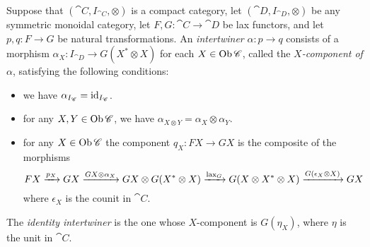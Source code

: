 \documentclass[12pt,oneside,article,draft]{memoir}
\begin{document}
\begin{definition}

Suppose that $(\cat{C},I_{\cat{C}},\otimes)$ is a compact category, let $(\cat{D},I_{\cat{D}},\otimes)$ be any symmetric monoidal category, let $F,G\colon\cat{C}\to\cat{D}$ be lax functors, and let $p,q\colon F\to G$ be natural transformations.
An \emph{intertwiner} $\alpha\colon p\to q$ consists of a morphism $\alpha_X\colon I_{\cat{D}}\to G(X^\ast\otimes X)$ for each $X\in\operatorname{Ob}\mathscr{C}$, called the \emph{$X$-component of $\alpha$}, satisfying the following conditions:
\begin{itemize}
   \item we have $\alpha_{I_{\mathscr{C}}}=\operatorname{id}_{I_{\mathscr{C}}}$.
   \item for any $X,Y\in\operatorname{Ob}\mathscr{C}$, we have $\alpha_{X\otimes Y}=\alpha_X\otimes\alpha_Y$.
   \item for any $X\in\operatorname{Ob}\mathscr{C}$ the component $q_X\colon FX\to GX$ is the composite of the morphisms
      $$FX\xrightarrow{p_X}GX\xrightarrow{GX\otimes\alpha_X}
      GX\otimes G(X^\ast\otimes X)\xrightarrow{\textnormal{lax}_G}
      G(X\otimes X^\ast\otimes X)\xrightarrow{G(\epsilon_X\otimes X)}
      GX
      $$
   where $\epsilon_X$ is the counit in $\cat{C}$.
\end{itemize}
The \emph{identity intertwiner} is the one whose $X$-component is $G(\eta_X)$, where $\eta$ is the unit in $\cat{C}$.

\end{definition}
\end{document}
